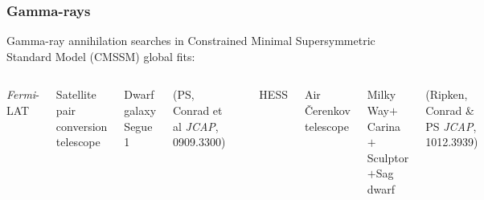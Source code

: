 \documentclass[xcolor=dvipsnames]{beamer}
\newcommand{\cblue}[1]{{\color[rgb]{0.1, 0.0, 0.6} #1}}
\begin{document}
\begin{frame}
\frametitle{Gamma-rays}

Gamma-ray annihilation searches in Constrained Minimal Supersymmetric Standard Model (CMSSM) global fits: 
\vspace{3mm}

\begin{columns}[c]

\cblue{\textit{Fermi}-LAT}

{\footnotesize
Satellite pair conversion telescope

Dwarf galaxy Segue 1\vspace{2mm}

{\tiny (PS, Conrad et al {\it JCAP}, 0909.3300)}

\includegraphics[height=0.6\textwidth, trim = 20 182 20 220, clip=true]{B50_H0_All_P_lin_2D_profl_7}

}

\cblue{HESS}

{\footnotesize
Air \v{C}erenkov telescope

Milky Way$+$Carina$+$Sculptor$+$Sag dwarf\vspace{2mm}

{\tiny(Ripken, Conrad \& PS {\it JCAP}, 1012.3939)}\vspace{2mm}

}
\end{columns}
\end{frame}
\end{document}
